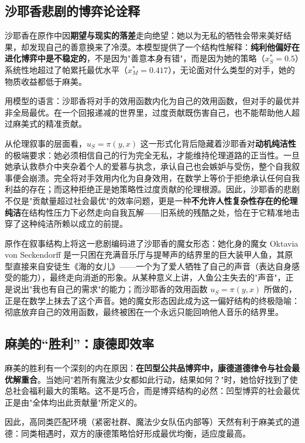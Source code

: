 \documentclass[12pt]{article}
\begin{document}
\subsection{沙耶香悲剧的博弈论诠释}

沙耶香在原作中因\textbf{期望与现实的落差}走向绝望：她以为无私的牺牲会带来美好结果，却发现自己的善意换来了冷漠。本模型提供了一个结构性解释：\textbf{纯利他偏好在进化博弈中是不稳定的}，不是因为"善意本身有错"，而是因为她的策略（$x_S^* = 0.5$）系统性地超过了帕累托最优水平（$x_M^* = 0.417$），无论面对什么类型的对手，她的物质收益都低于麻美。

用模型的语言：沙耶香将对手的效用函数内化为自己的效用函数，但对手的最优并非全局最优。在一个回报递减的世界里，过度贡献既伤害自己，也不能帮助他人超过麻美式的精准贡献。

从伦理叙事的层面看，$u_S = \pi(y,x)$ 这一形式化背后隐藏着沙耶香对\textbf{动机纯洁性}的极端要求：她必须相信自己的行为完全无私，才能维持伦理道路的正当性。一旦她承认救恭介中夹杂着个人的爱慕与执念，承认自己也会嫉妒与受伤，整个自我叙事便会崩溃。完全将对手效用内化为自身效用，在数学上等价于拒绝承认任何自我利益的存在；而这种拒绝正是她策略性过度贡献的伦理根源。因此，沙耶香的悲剧不仅是"贡献量超过社会最优"的效率问题，更是一种\textbf{不允许人性复杂性存在的伦理纯洁}在结构性压力下必然走向自我瓦解——旧系统的残酷之处，恰在于它精准地击穿了这种纯洁所赖以成立的前提。

原作在叙事结构上将这一悲剧编码进了沙耶香的魔女形态：她化身的魔女 Oktavia von Seckendorff 是一只困在充满音乐厅与提琴声的结界里的巨大装甲人鱼，其原型直接来自安徒生《海的女儿》——一个为了爱人牺牲了自己的声音（表达自身感受的能力），最终走向消逝的形象。从某种意义上讲，人鱼公主失去的"声音"，正是说出"我也有自己的需求"的能力；而沙耶香的效用函数 $u_S = \pi(y,x)$ 所做的，正是在数学上抹去了这个声音。她的魔女形态因此成为这一偏好结构的终极隐喻：彻底放弃自己的效用函数，最终被困在一个永远只能回响他人音乐的结界里。

\subsection{麻美的“胜利”：康德即效率}

麻美的胜利有一个深刻的内在原因：\textbf{在凹型公共品博弈中，康德道德律令与社会最优解重合}。当她问"若所有魔法少女都如此行动，结果如何？"时，她恰好找到了使总社会福利最大的策略。这不是巧合，而是博弈结构的必然：凹型博弈的社会最优正是由"全体均出此贡献量"所定义的。

因此，高同类匹配环境（紧密社群、魔法少女队伍内部等）天然有利于麻美式的道德：同类相遇时，双方的康德策略恰好形成最优均衡，适应度最高。
\end{document}
